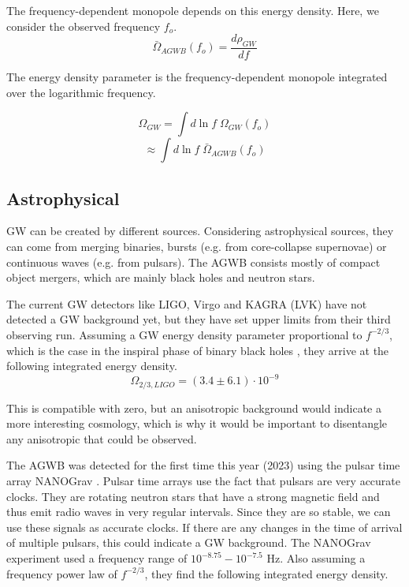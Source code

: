 The frequency-dependent monopole depends on this energy density. Here, we consider the observed frequency $f_o$.
\begin{equation}
    \bar{\Omega}_{AGWB}(f_o)=\frac{d\rho_{GW}}{df}
\end{equation}

The energy density parameter is the frequency-dependent monopole integrated over the logarithmic frequency.

\begin{equation}
    \Omega_{GW} = \int d\ln f \; \Omega_{GW}(f_o) 
\end{equation}
\begin{equation}
    \approx \int d\ln f \; \bar{\Omega}_{AGWB}(f_o)
\end{equation}

\subsection{Astrophysical}
\label{astro_GWB}
GW can be created by different sources. Considering astrophysical sources, they can come from
merging binaries, bursts (e.g. from core-collapse supernovae) or continuous waves 
(e.g. from pulsars). 
The AGWB consists mostly of compact object mergers, which are mainly black holes and neutron stars. 

The current GW detectors like LIGO, Virgo and KAGRA (LVK) have not detected a GW background yet, but they have set upper limits from their third observing run. Assuming a GW energy density parameter proportional to $f^{-2/3}$, which is the case in the inspiral phase of binary black holes \cite{phinney_practical_2001}, they arrive at the following integrated energy density.
\begin{equation}
    \Omega_{2/3, LIGO} = (3.4 \pm 6.1) \cdot 10^{-9}
\end{equation}

This is compatible with zero, but an anisotropic background would indicate
a more interesting cosmology, which is why it would be important to disentangle
any anisotropic that could be observed.

The AGWB was detected for the first time this year (2023) using the pulsar time array NANOGrav \cite{agazie_nanograv_2023}. Pulsar time arrays use the fact that pulsars are very accurate clocks. They are rotating neutron stars that have a strong magnetic field and thus emit radio waves in very regular intervals. Since they are so stable, we can use these signals as accurate clocks. If there are any changes in the time of arrival of multiple pulsars, this could indicate a GW background. 
The NANOGrav experiment used a frequency range of $10^{-8.75} - 10^{-7.5}$ Hz. 
Also assuming a frequency power law of $f^{-2/3}$, they find the following integrated energy density.

